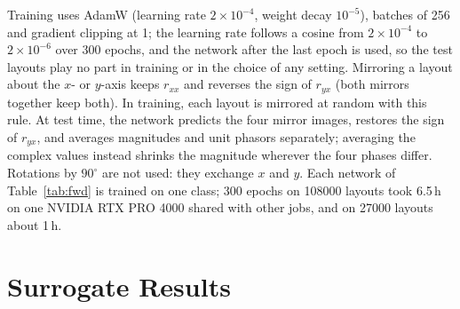 \documentclass[journal]{IEEEtran}
\newcommand{\e}[2]{\ensuremath{#1{\times}10^{#2}}}
\begin{document}
Training uses AdamW \cite{adamw} (learning rate $\e{2}{-4}$, weight decay $10^{-5}$), batches of 256 and gradient clipping at 1; the learning rate follows a cosine from $\e{2}{-4}$ to $\e{2}{-6}$ over 300 epochs, and the network after the last epoch is used, so the test layouts play no part in training or in the choice of any setting. Mirroring a layout about the $x$- or $y$-axis keeps $r_{xx}$ and reverses the sign of $r_{yx}$ (both mirrors together keep both). In training, each layout is mirrored at random with this rule. At test time, the network predicts the four mirror images, restores the sign of $r_{yx}$, and averages magnitudes and unit phasors separately; averaging the complex values instead shrinks the magnitude wherever the four phases differ. Rotations by $90^\circ$ are not used: they exchange $x$ and $y$. Each network of Table~\ref{tab:fwd} is trained on one class; 300 epochs on \num{108000} layouts took 6.5\,h on one NVIDIA RTX PRO 4000 shared with other jobs, and on \num{27000} layouts about 1\,h.

\section{Surrogate Results}\label{sec:fwdresults}
\end{document}
